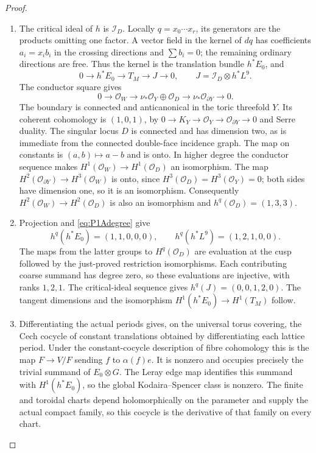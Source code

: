 \documentclass[11pt,a4paper]{article}
\theoremstyle{definition}
\begin{document}
\begin{proof}
\begin{enumerate}[label=\arabic*.]
\item The critical ideal of $h$ is $\mathcal I_D$. Locally
$q=x_0\cdots x_r$, its generators are the products omitting
one factor. A vector field in the kernel of $dq$ has coefficients
$a_i=x_i b_i$ in the crossing directions and
$\sum b_i=0$; the remaining ordinary directions are free.
Thus the kernel is the translation bundle $h^*E_0$, and
\[
0\to h^*E_0\to T_M\to J\to0,
\qquad J=\mathcal I_D\otimes h^*L^9.
\]
The conductor square gives
\[
0\to\mathcal O_W\to\nu_*\mathcal O_Y\oplus\mathcal O_D
 \to\nu_*\mathcal O_{\partial Y}\to0.
\]
The boundary is connected and anticanonical in the toric
threefold $Y$. Its coherent cohomology is $(1,0,1)$, by
$0\to K_Y\to\mathcal O_Y\to\mathcal O_{\partial Y}\to0$
and Serre duality. The singular locus $D$ is connected and
has dimension two, as is immediate from the connected
double-face incidence graph. The map on constants is
$(a,b)\mapsto a-b$ and is onto. In higher degree the conductor
sequence makes $H^1(\mathcal O_W)\to H^1(\mathcal O_D)$
an isomorphism. The map
$H^2(\mathcal O_{\partial Y})\to H^3(\mathcal O_W)$ is onto,
since $H^3(\mathcal O_D)=H^3(\mathcal O_Y)=0$; both sides
have dimension one, so it is an isomorphism. Consequently
$H^2(\mathcal O_W)\to H^2(\mathcal O_D)$ is also an
isomorphism and $h^q(\mathcal O_D)=(1,3,3)$.

\item Projection and \eqref{eq:P1Adegree} give
\[
h^q(h^*E_0)=(1,1,0,0,0),\qquad
h^q(h^*L^9)=(1,2,1,0,0).
\]
The maps from the latter groups to $H^q(\mathcal O_D)$
are evaluation at the cusp followed by the just-proved
restriction isomorphisms. Each contributing coarse summand
has degree zero, so these evaluations are injective, with
ranks $1,2,1$. The critical-ideal sequence gives
$h^q(J)=(0,0,1,2,0)$. The tangent dimensions and the
isomorphism $H^1(h^*E_0)\to H^1(T_M)$ follow.

\item Differentiating the actual periods gives, on the universal
torus covering, the Cech cocycle of constant translations
obtained by differentiating each lattice period. Under the
constant-cocycle description of fibre cohomology this is
the map $F\to V/F$ sending $f$ to $\alpha(f)e$.
It is nonzero and occupies precisely the trivial summand
of $E_0\otimes G$. The Leray edge map identifies this summand
with $H^1(h^*E_0)$, so the global Kodaira--Spencer class is
nonzero. The finite and toroidal charts depend holomorphically
on the parameter and supply the actual compact family,
so this cocycle is the derivative of that family on every chart.


\end{enumerate}
\end{proof}
\end{document}
